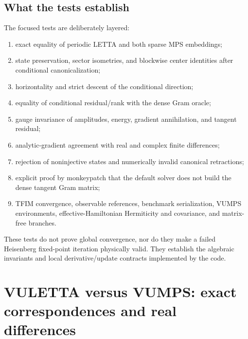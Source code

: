 \documentclass[11pt]{article}
\begin{document}
\subsection{What the tests establish}

The focused tests are deliberately layered:
\begin{enumerate}
  \item exact equality of periodic LETTA and both sparse MPS embeddings;
  \item state preservation, sector isometries, and blockwise center
        identities after conditional canonicalization;
  \item horizontality and strict descent of the conditional direction;
  \item equality of conditional residual/rank with the dense Gram oracle;
  \item gauge invariance of amplitudes, energy, gradient annihilation, and
        tangent residual;
  \item analytic-gradient agreement with real and complex finite
        differences;
  \item rejection of noninjective states and numerically invalid canonical
        retractions;
  \item explicit proof by monkeypatch that the default solver does not build
        the dense tangent Gram matrix;
  \item TFIM convergence, observable references, benchmark serialization,
        VUMPS environments, effective-Hamiltonian Hermiticity and covariance,
        and matrix-free branches.
\end{enumerate}
These tests do not prove global convergence, nor do they make a failed
Heisenberg fixed-point iteration physically valid.  They establish the
algebraic invariants and local derivative/update contracts implemented by the
code.

\section{VULETTA versus VUMPS: exact correspondences and real differences}
\label{sec:comparison}
\end{document}
